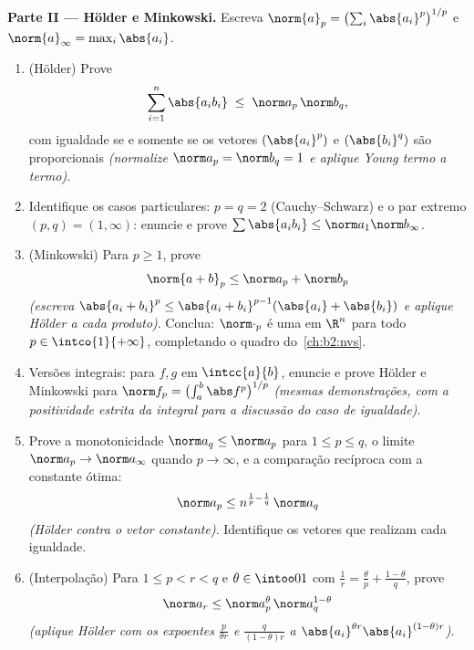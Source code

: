 \begin{problem}
\medskip
\noindent\textbf{Parte II --- Hölder e Minkowski.} Escreva
$\norm{a}_p = \bigl(\sum_i \abs{a_i}^p\bigr)^{1/p}$ e
$\norm{a}_\infty = \max_i\abs{a_i}$.
\begin{enumerate}[resume]
  \item (Hölder) Prove
        \[
        \sum_{i=1}^{n}\abs{a_ib_i} \;\leq\;
        \norm a_p\,\norm b_q ,
        \]
        com igualdade se e somente se os vetores $(\abs{a_i}^p)$ e
        $(\abs{b_i}^q)$ são proporcionais \emph{(normalize
        $\norm a_p = \norm b_q = 1$ e aplique Young termo a termo)}.
  \item Identifique os casos particulares: $p = q = 2$
        (Cauchy--Schwarz) e o par extremo $(p, q) = (1,
        \infty)$: enuncie e prove $\sum\abs{a_ib_i} \leq
        \norm a_1\norm b_\infty$.
  \item (Minkowski) Para $p \geq 1$, prove
        \[
        \norm{a + b}_p \leq \norm a_p + \norm b_p
        \]
        \emph{(escreva $\abs{a_i + b_i}^p \leq \abs{a_i +
        b_i}^{p-1}(\abs{a_i} + \abs{b_i})$ e aplique Hölder
        a cada produto)}. Conclua: $\norm\cdot_p$ é uma 
        em $\R^n$ para todo $p \in \intco{1}{+\infty}$,
        completando o quadro do~\cref{ch:b2:nvs}.
  \item Versões integrais: para $f, g$  em
        $\intcc{a}{b}$, enuncie e prove Hölder e Minkowski
        para $\norm f_p = \bigl(\int_a^b\abs
        f^p\bigr)^{1/p}$ \emph{(mesmas demonstrações, com a
        positividade estrita da integral para a discussão do caso de
        igualdade)}.
  \item Prove a monotonicidade $\norm a_q \leq \norm a_p$ para $1
        \leq p \leq q$, o limite $\norm a_p \to
        \norm a_\infty$ quando $p \to \infty$, e a comparação
        recíproca com a constante ótima:
        \[
        \norm a_p \leq n^{\frac1p - \frac1q}\,\norm a_q
        \]
        \emph{(Hölder contra o vetor constante)}. Identifique
        os vetores que realizam cada igualdade.
  \item (Interpolação) Para $1 \leq p < r < q$ e $\theta \in
        \intoo01$ com $\frac1r = \frac\theta p +
        \frac{1-\theta}q$, prove
        \[
        \norm a_r \leq \norm a_p^{\theta}\,
        \norm a_q^{1-\theta}
        \]
        \emph{(aplique Hölder com os expoentes $\frac{p}{\theta
        r}$ e $\frac{q}{(1-\theta)r}$ a $\abs{a_i}^{\theta
        r}\abs{a_i}^{(1-\theta)r}$)}.
\end{enumerate}


\end{problem}
